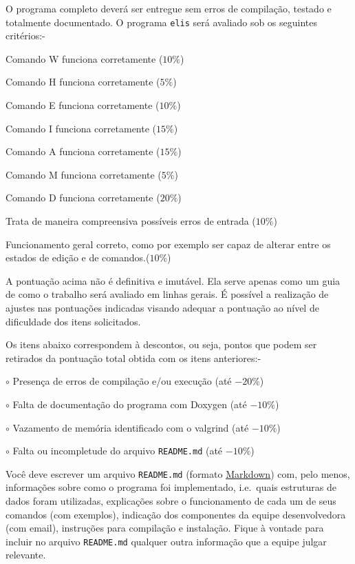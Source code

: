 \documentclass[11pt,a4paper]{article}
\begin{document}
O programa completo deverá ser entregue sem erros de compilação, testado e totalmente
documentado.
O programa \texttt{elis} será avaliado sob os seguintes critérios:-
\begin{itemize*}
    \item Comando W funciona corretamente ($10 \%$)
    \item Comando H funciona corretamente ($5 \%$)
    \item Comando E funciona corretamente ($10 \%$)
    \item Comando I funciona corretamente ($15 \%$)
    \item Comando A funciona corretamente ($15 \%$)
    \item Comando M funciona corretamente ($5 \%$)
    \item Comando D funciona corretamente ($20 \%$)
    \item Trata de maneira compreensiva possíveis erros de entrada ($10 \%$)
    \item Funcionamento geral correto, como por exemplo ser capaz
        de alterar entre os estados de edição e de comandos.($10 \%$)
\end{itemize*}

A pontuação acima não é definitiva e imutável.
Ela serve apenas como um guia de como o trabalho será avaliado em linhas gerais.
É possível a realização de ajustes nas pontuações indicadas visando adequar a pontuação
ao nível de dificuldade dos itens solicitados.

Os itens abaixo correspondem à descontos, ou seja, pontos que podem ser retirados
da pontuação total obtida com os itens anteriores:-
\begin{itemize*}
    \item[$\circ$] Presença de erros de compilação e/ou execução (até $-20 \%$)
    \item[$\circ$] Falta de documentação do programa com Doxygen (até $-10 \%$)
    \item[$\circ$] Vazamento de memória identificado com o valgrind (até $-10 \%$)
    \item[$\circ$] Falta ou incompletude do arquivo \texttt{README.md} (até $-10 \%$)
\end{itemize*}

Você deve escrever um arquivo \texttt{README.md}
(formato \href{http://daringfireball.net/projects/markdown/syntax}{Markdown}) com, pelo menos, informações sobre
como o programa foi implementado, i.e.\ quais estruturas de dados foram utilizadas,
explicações sobre o funcionamento de cada um de seus comandos (com exemplos),
indicação dos componentes da equipe desenvolvedora (com email),
instruções para compilação e instalação.
Fique à vontade para incluir no arquivo \texttt{README.md} qualquer outra informação
que a equipe julgar relevante.
\end{document}
